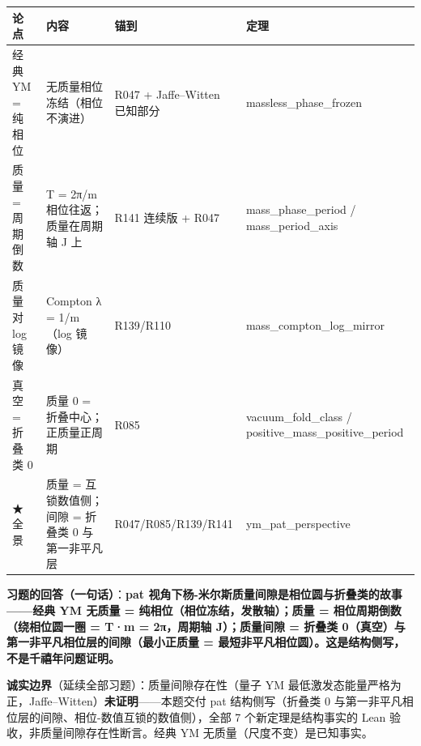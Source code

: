 \documentclass[
]{article}
\newcounter{none} %
\begin{document}
{\def\LTcaptype{none} %
\begin{longtable}[]{@{}
  >{\raggedright\arraybackslash}p{}
  >{\raggedright\arraybackslash}p{}
  >{\raggedright\arraybackslash}p{}
  >{\raggedright\arraybackslash}p{}@{}}
\toprule\noalign{}
\begin{minipage}[b]{\linewidth}\raggedright
论点
\end{minipage} & \begin{minipage}[b]{\linewidth}\raggedright
内容
\end{minipage} & \begin{minipage}[b]{\linewidth}\raggedright
锚到
\end{minipage} & \begin{minipage}[b]{\linewidth}\raggedright
定理
\end{minipage} \\
\midrule\noalign{}
\endhead
\bottomrule\noalign{}
\endlastfoot
经典 YM = 纯相位 & 无质量相位冻结（相位不演进） & R047 + Jaffe--Witten
已知部分 & massless\_phase\_frozen \\
质量 = 周期倒数 & T = 2π/m 相位往返；质量在周期轴 J 上 & R141 连续版 +
R047 & mass\_phase\_period / mass\_period\_axis \\
质量对 log 镜像 & Compton λ = 1/m（log 镜像） & R139/R110 &
mass\_compton\_log\_mirror \\
真空 = 折叠类 0 & 质量 0 = 折叠中心；正质量正周期 & R085 &
vacuum\_fold\_class / positive\_mass\_positive\_period \\
★全景 & 质量 = 互锁数值侧；间隙 = 折叠类 0 与第一非平凡层 &
R047/R085/R139/R141 & ym\_pat\_perspective \\
\end{longtable}
}

\textbf{习题的回答（一句话）}：\textbf{pat
视角下杨-米尔斯质量间隙是相位圆与折叠类的故事------经典 YM 无质量 =
纯相位（相位冻结，发散轴）；质量 = 相位周期倒数（绕相位圆一圈 = T·m =
2π，周期轴 J）；质量间隙 = 折叠类
0（真空）与第一非平凡相位层的间隙（最小正质量 =
最短非平凡相位圆）。这是结构侧写，不是千禧年问题证明。}

\textbf{诚实边界}（延续全部习题）：质量间隙存在性（量子 YM
最低激发态能量严格为正，Jaffe--Witten）\textbf{未证明}------本题交付 pat
结构侧写（折叠类 0
与第一非平凡相位层的间隙、相位-数值互锁的数值侧），全部 7
个新定理是结构事实的 Lean 验收，非质量间隙存在性断言。经典 YM
无质量（尺度不变）是已知事实。
\end{document}
